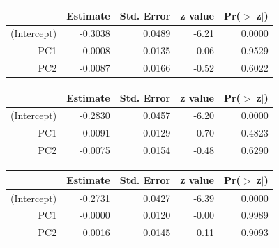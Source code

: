 \documentclass[a4paper,12pt]{Latex/Classes/PhDthesisPSnPDF}
\begin{document}
\newpage

\begin{center}
\begin{table}[ht]
\centering
\begin{tabular}{rrrrr}
  \hline
 & Estimate & Std. Error & z value & Pr($>$$|$z$|$) \\ 
  \hline
(Intercept) & -0.3038 & 0.0489 & -6.21 & 0.0000 \\ 
  PC1 & -0.0008 & 0.0135 & -0.06 & 0.9529 \\ 
  PC2 & -0.0087 & 0.0166 & -0.52 & 0.6022 \\ 
   \hline
\end{tabular}
\end{table}\end{center}

\begin{center}
\begin{table}[ht]
\centering
\begin{tabular}{rrrrr}
  \hline
 & Estimate & Std. Error & z value & Pr($>$$|$z$|$) \\ 
  \hline
(Intercept) & -0.2830 & 0.0457 & -6.20 & 0.0000 \\ 
  PC1 & 0.0091 & 0.0129 & 0.70 & 0.4823 \\ 
  PC2 & -0.0075 & 0.0154 & -0.48 & 0.6290 \\ 
   \hline
\end{tabular}
\end{table}\end{center}
\begin{center}
\begin{table}[ht]
\centering
\begin{tabular}{rrrrr}
  \hline
 & Estimate & Std. Error & z value & Pr($>$$|$z$|$) \\ 
  \hline
(Intercept) & -0.2731 & 0.0427 & -6.39 & 0.0000 \\ 
  PC1 & -0.0000 & 0.0120 & -0.00 & 0.9989 \\ 
  PC2 & 0.0016 & 0.0145 & 0.11 & 0.9093 \\ 
   \hline
\end{tabular}
\end{table}\end{center}
\end{document}
